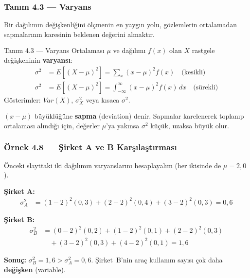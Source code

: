 ﻿\documentclass[light]{lutbeamer}
\begin{document}
\begin{frame}[fragile]
  \frametitle{Tanım 4.3 --- Varyans}
  Bir dağılımın değişkenliğini ölçmenin en yaygın yolu, gözlemlerin ortalamadan sapmalarının karesinin beklenen değerini almaktır.
  \begin{center}
    \begin{minipage}{0.95\textwidth}
      \begin{block}{Tanım 4.3 --- Varyans}
        Ortalaması $\mu$ ve dağılımı $f(x)$ olan $X$ rastgele değişkeninin \textbf{varyansı}:
        {\small
        \begin{align*}
          \sigma^2 &= E[(X-\mu)^2] = \sum_x (x-\mu)^2 f(x) \quad \text{(kesikli)} \\[4pt]
          \sigma^2 &= E[(X-\mu)^2] = \int_{-\infty}^{\infty} (x-\mu)^2 f(x)\,dx \quad \text{(sürekli)}
        \end{align*}
        }
        Gösterimler: $Var(X)$, $\sigma^2_X$ veya kısaca $\sigma^2$.
      \end{block}
    \end{minipage}
  \end{center}
  $(x - \mu)$ büyüklüğüne \textbf{sapma} (deviation) denir. Sapmalar karelenerek toplanıp ortalaması alındığı için, değerler $\mu$'ya yakınsa $\sigma^2$ küçük, uzaksa büyük olur.
\end{frame}

\begin{frame}[fragile]
  \frametitle{Örnek 4.8 --- Şirket A ve B Karşılaştırması}

  \smallskip
  Önceki slayttaki iki dağılımın varyanslarını hesaplayalım (her ikisinde de $\mu = 2{,}0$).

  \medskip
  \textbf{Şirket A:}
  {\small
  \begin{align*}
    \sigma^2_A &= (1-2)^2(0{,}3) + (2-2)^2(0{,}4) + (3-2)^2(0{,}3) = 0{,}6
  \end{align*}
  }

  \textbf{Şirket B:}
  {\small
  \begin{align*}
    \sigma^2_B &= (0-2)^2(0{,}2) + (1-2)^2(0{,}1) + (2-2)^2(0{,}3)\\
               &\quad + (3-2)^2(0{,}3) + (4-2)^2(0{,}1) = 1{,}6
  \end{align*}
  }

  \textbf{Sonuç:} $\sigma^2_B = 1{,}6 > \sigma^2_A = 0{,}6$. Şirket~B'nin araç kullanım sayısı çok daha \textbf{değişken} (variable).
\end{frame}
\end{document}
